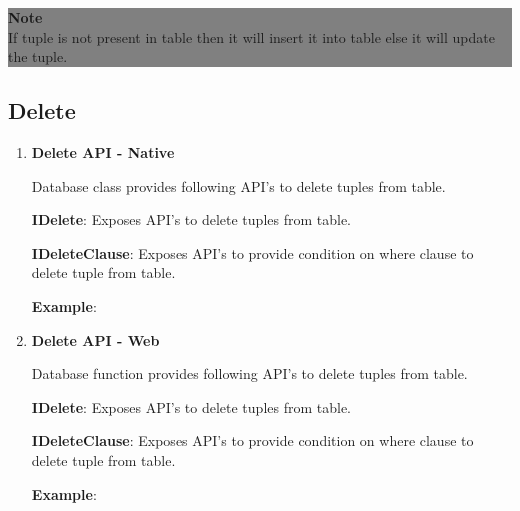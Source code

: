 			\begin{center}
				\colorbox{grey}{
				\parbox[t]{.8\linewidth}{
					\fontsize{11pt}{11pt}\selectfont %
					\vspace*{0.1cm} %

					\hfill \textbf{Note} \\
					If tuple is not present in table then it will insert it into table else it will update the tuple.

					\vspace*{0.0cm} %
					}
			}

			\end{center}


	\subsection{Delete}

		\begin{enumerate}

			\item \small \textbf{Delete API - Native}
				\par 
				Database class provides following API's to delete tuples from table.

					
		
				\textbf{IDelete}:  Exposes API's to delete tuples from table.

					

			
				\textbf{IDeleteClause}: Exposes API's to provide condition on where clause to delete tuple from table.
					

				\textbf{Example}: 
					

			\item \small \textbf{Delete API - Web}
				\par 
				Database function provides following API's to delete tuples from table.

					
		
				\textbf{IDelete}:  Exposes API's to delete tuples from table.

					

			
				\textbf{IDeleteClause}: Exposes API's to provide condition on where clause to delete tuple from table.
					

				\textbf{Example}: 
					

		\end{enumerate}

